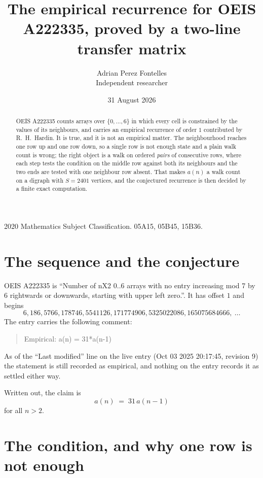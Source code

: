 \documentclass[11pt,a4paper]{article}
\title{The empirical recurrence for OEIS A222335, proved by a two-line transfer matrix}
\author{Adrian Perez Fontelles\\ \small Independent researcher}
\date{31 August 2026}
\theoremstyle{plain}
\theoremstyle{definition}
\begin{document}
\maketitle

\begin{abstract}
OEIS A222335 counts arrays over $\{0,\dots,6\}$ in which every cell is constrained by the
values of its neighbours, and carries an empirical recurrence of order $1$ contributed
by R.~H.~Hardin. It is true, and it is not an empirical matter. The neighbourhood reaches one
row up and one row down, so a single row is not enough state and a plain walk count
is wrong; the right object is a walk on ordered \emph{pairs} of consecutive rows, where
each step tests the condition on the middle row against both its neighbours and the two
ends are tested with one neighbour row absent. That makes $a(n)$ a walk count on a digraph
with $S=2401$ vertices, and the conjectured recurrence is then decided by a finite exact
computation.
\end{abstract}

\noindent\small 2020 Mathematics Subject Classification. 05A15, 05B45, 15B36.\normalsize

\section{The sequence and the conjecture}

OEIS A222335 is ``Number of nX2 0..6 arrays with no entry increasing mod 7 by 6 rightwards or downwards, starting with upper left zero.''. It has offset $1$ and begins
\[
6, 186, 5766, 178746, 5541126, 171774906, 5325022086, 165075684666,\ \dots
\]
The entry carries the following comment:
\begin{quote}\small
Empirical: a(n) = 31*a(n-1)
\end{quote}
As of the ``Last modified'' line on the live entry (Oct 03 2025 20:17:45, revision 9) the statement is
still recorded as empirical, and nothing on the entry records it as settled either way.

Written out, the claim is
\begin{equation}\label{eq:conj}
a(n)\;=\;31\,a(n-1)
\end{equation}
for all $n>2$.

\section{The condition, and why one row is not enough}
\end{document}

